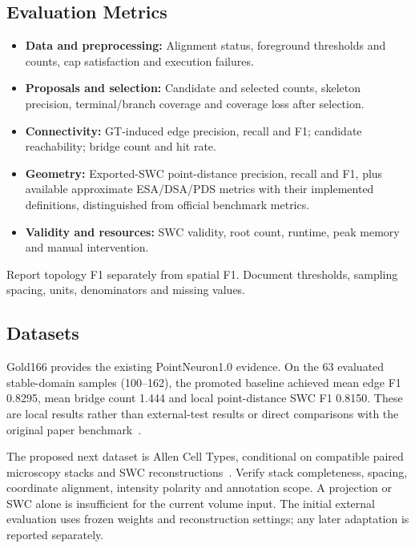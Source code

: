 \documentclass[11pt,a4paper]{article}
\begin{document}
\subsection{Evaluation Metrics}
\begin{itemize}
    \item \textbf{Data and preprocessing:} Alignment status, foreground thresholds and counts, cap satisfaction and execution failures.
    \item \textbf{Proposals and selection:} Candidate and selected counts, skeleton precision, terminal/branch coverage and coverage loss after selection.
    \item \textbf{Connectivity:} GT-induced edge precision, recall and F1; candidate reachability; bridge count and hit rate.
    \item \textbf{Geometry:} Exported-SWC point-distance precision, recall and F1, plus available approximate ESA/DSA/PDS metrics with their implemented definitions, distinguished from official benchmark metrics.
    \item \textbf{Validity and resources:} SWC validity, root count, runtime, peak memory and manual intervention.
\end{itemize}
Report topology F1 separately from spatial F1. Document thresholds, sampling spacing, units, denominators and missing values.

\subsection{Datasets}
Gold166 provides the existing PointNeuron1.0 evidence. On the 63 evaluated stable-domain samples (100--162), the promoted baseline achieved mean edge F1 0.8295, mean bridge count 1.444 and local point-distance SWC F1 0.8150. These are local results rather than external-test results or direct comparisons with the original paper benchmark~\cite{report}.

The proposed next dataset is Allen Cell Types, conditional on compatible paired microscopy stacks and SWC reconstructions~\cite{allen}. Verify stack completeness, spacing, coordinate alignment, intensity polarity and annotation scope. A projection or SWC alone is insufficient for the current volume input. The initial external evaluation uses frozen weights and reconstruction settings; any later adaptation is reported separately.
\end{document}
